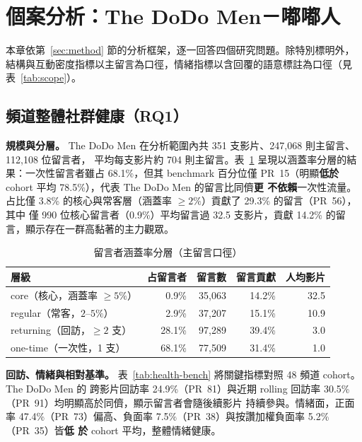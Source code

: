 \section{個案分析：The DoDo Men－嘟嘟人}
\label{sec:case}

本章依第~\ref{sec:method} 節的分析框架，逐一回答四個研究問題。除特別標明外，
結構與互動密度指標以主留言為口徑，情緒指標以含回覆的語意標註為口徑（見表~\ref{tab:scope}）。

\subsection{頻道整體社群健康（RQ1）}
\label{sec:case-health}

\textbf{規模與分層。} The DoDo Men 在分析範圍內共 351 支影片、247{,}068 則主留言、112{,}108 位留言者，
平均每支影片約 704 則主留言。表~\ref{tab:tiers} 呈現以涵蓋率分層的結果：一次性留言者雖占 68.1\%，但其
benchmark 百分位僅 PR~15（明顯\textbf{低於} cohort 平均 78.5\%），代表 The DoDo Men 的留言比同儕\textbf{更
不依賴}一次性流量。占比僅 3.8\% 的核心與常客層（涵蓋率 $\ge 2\%$）貢獻了 29.3\% 的留言（PR~56），其中
僅 990 位核心留言者（0.9\%）平均留言過 32.5 支影片，貢獻 14.2\% 的留言，顯示存在一群高黏著的主力觀眾。

\begin{table}[H]
\centering
\caption{留言者涵蓋率分層（主留言口徑）}
\label{tab:tiers}
\small
\begin{tabular}{lrrrr}
\toprule
\textbf{層級} & \textbf{占留言者} & \textbf{留言數} & \textbf{留言貢獻} & \textbf{人均影片}\\
\midrule
core（核心，涵蓋率 $\ge 5\%$） & 0.9\% & 35{,}063 & 14.2\% & 32.5 \\
regular（常客，$2$–$5\%$） & 2.9\% & 37{,}207 & 15.1\% & 10.9 \\
returning（回訪，$\ge 2$ 支） & 28.1\% & 97{,}289 & 39.4\% & 3.0 \\
one-time（一次性，1 支） & 68.1\% & 77{,}509 & 31.4\% & 1.0 \\
\bottomrule
\end{tabular}
\end{table}

\textbf{回訪、情緒與相對基準。} 表~\ref{tab:health-bench} 將關鍵指標對照 48 頻道 cohort。The DoDo Men 的
跨影片回訪率 24.9\%（PR~81）與近期 rolling 回訪率 30.5\%（PR~91）均明顯高於同儕，顯示留言者會隨後續影片
持續參與。情緒面，正面率 47.4\%（PR~73）偏高、負面率 7.5\%（PR~38）與按讚加權負面率 5.2\%（PR~35）皆\textbf{低
於} cohort 平均，整體情緒健康。

